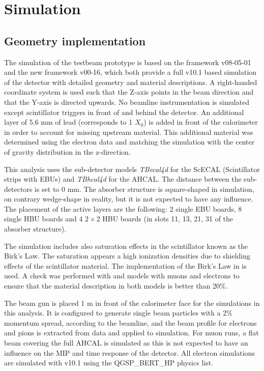 \section{Simulation}

\subsection{Geometry implementation}

The simulation of the testbeam prototype is based on the \mokka \cite{MoradeFreitas:2002kj} framework v08-05-01 and the new \ddhep \cite{Frank:2014zya} framework v00-16, which both provide a full \geant v10.1 based simulation of the detector with detailed geometry and material descriptions. A right-handed coordinate system is used such that the Z-axis points in the beam direction and that the Y-axis is directed upwards. No beamline instrumentation is simulated except scintillator triggers in front of and behind the detector. An additional layer of 5.6 mm of lead (corresponds to 1 $X_0$) is added in front of the calorimeter in order to account for missing upstream material. This additional material was determined using the electron data and matching the simulation with the center of gravity distribution in the z-direction.

This analysis uses the sub-detector \mokka models \textit{TBecal4d} for the ScECAL (Scintillator strips with EBUs) and \textit{TBhcal4d} for the AHCAL. The distance between the sub-detectors is set to 0 mm. The absorber structure is square-shaped in simulation, on contrary wedge-shape in reality, but it is not expected to have any influence. The placement of the active layers are the following: 2 single EBU boards, 8 single HBU boards and 4 $2\times2$ HBU boards (in slots 11, 13, 21, 31 of the absorber structure).

The simulation includes also saturation effects in the scintillator known as the Birk's Law. The saturation appears a high ionization densities due to shielding effects of the scintillator material. The implementation of the Birk's Law in \geant is used. A check was performed with \mokka and \ddhep models with muons and electrons to ensure that the material description in both models is better than 20\%.

The beam gun is placed 1 m in front of the calorimeter face for the simulations in this analysis. It is configured to generate single beam particles with a 2\% momentum spread, according to the beamline, and the beam profile for electrons and pions is extracted from data and applied to simulation. For muon runs, a flat beam covering the full AHCAL is simulated as this is not expected to have an influence on the MIP and time response of the detector. All electron simulations are simulated with \geant v10.1 using the QGSP\_BERT\_HP physics list.

